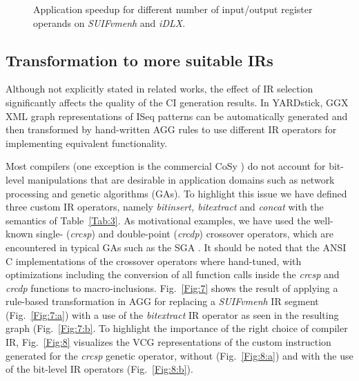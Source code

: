 \documentclass{comjnl}
\begin{document}
\begin{figure}[tb]
  \centering
  \caption{Application speedup for different number of input/output register operands on {\it SUIFvmenh} and {\it iDLX}.}
  \label{Fig:6}
  \vspace{-0.125cm}
\end{figure}

\subsection{Transformation to more suitable IRs}
\label{Sec:IRTransformations}
Although not explicitly stated in related works, the effect of IR selection significantly affects the quality of the CI generation results. In YARDstick, GGX XML graph representations of ISeq patterns can be automatically generated and then transformed by hand-written AGG rules to use different IR operators for implementing equivalent functionality.

Most compilers (one exception is the commercial CoSy \cite{ACE}) do not account for bit-level manipulations that are desirable in application domains such as network processing and genetic algorithms (GAs). To highlight this issue we have defined three custom IR operators, namely {\it bitinsert, bitextract} and {\it concat} with the semantics of Table~\ref{Tab:3}. As motivational examples, we have used the well-known single- ({\it crcsp}) and double-point ({\it crcdp}) crossover operators, which are encountered in typical GAs such as the SGA \cite{Goldberg89}. It should be noted that the ANSI C implementations of the crossover operators where hand-tuned, with optimizations including the conversion of all function calls inside the {\it crcsp} and {\it crcdp} functions to macro-inclusions. Fig.~\ref{Fig:7} shows the result of applying a rule-based transformation in AGG \cite{AGG} for replacing a {\it SUIFvmenh} IR segment (Fig.~\ref{Fig:7:a}) with a use of the {\it bitextract} IR operator as seen in the resulting graph (Fig.~\ref{Fig:7:b}. To highlight the importance of the right choice of compiler IR, Fig.~\ref{Fig:8} visualizes the VCG representations of the custom instruction generated for the {\it crcsp} genetic operator, without (Fig.~\ref{Fig:8:a}) and with the use of the bit-level IR operators (Fig.~\ref{Fig:8:b}).
\end{document}
